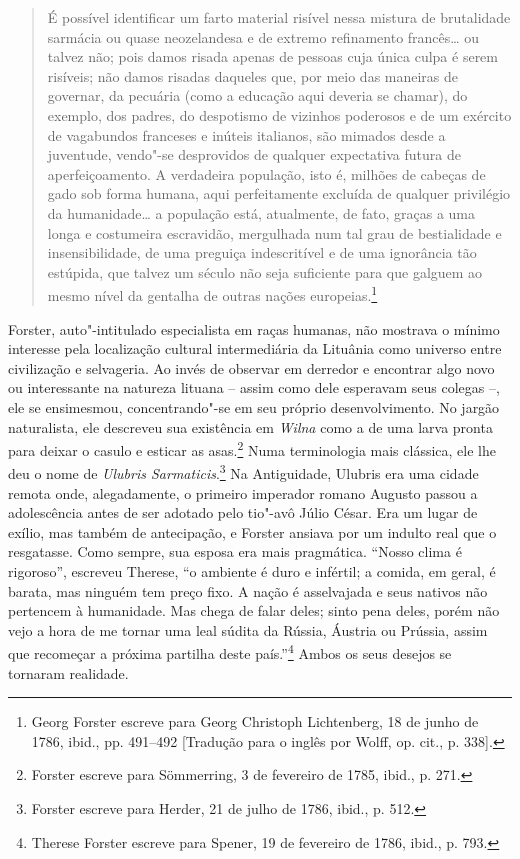 \begin{quote}
É possível identificar um farto material risível nessa mistura de
brutalidade sarmácia ou quase neozelandesa e de extremo refinamento
francês\ldots{} ou talvez não; pois damos risada apenas de pessoas cuja
única culpa é serem risíveis; não damos risadas daqueles que, por meio
das maneiras de governar, da pecuária (como a educação aqui deveria se
chamar), do exemplo, dos padres, do despotismo de vizinhos poderosos e
de um exército de vagabundos franceses e inúteis italianos, são mimados
desde a juventude, vendo"-se desprovidos de qualquer expectativa futura
de aperfeiçoamento. A verdadeira população, isto é, milhões de cabeças
de gado sob forma humana, aqui perfeitamente excluída de qualquer
privilégio da humanidade\ldots{} a população está, atualmente, de fato,
graças a uma longa e costumeira escravidão, mergulhada num tal grau de
bestialidade e insensibilidade, de uma preguiça indescritível e de uma
ignorância tão estúpida, que talvez um século não seja suficiente para
que galguem ao mesmo nível da gentalha de outras nações
europeias.\footnote{Georg Forster escreve para Georg Christoph Lichtenberg, 18 de junho de 1786, ibid., pp. 491--492 [Tradução para o inglês por Wolff, op. cit., p. 338].}
\end{quote}

Forster, auto"-intitulado especialista em raças humanas, não mostrava o
mínimo interesse pela localização cultural intermediária da Lituânia
como universo entre civilização e selvageria. Ao invés de observar em
derredor e encontrar algo novo ou interessante na natureza lituana -- assim como dele esperavam seus colegas --, 
ele se ensimesmou,
concentrando"-se em seu próprio desenvolvimento. No jargão naturalista,
ele descreveu sua existência em \textit{Wilna} como a de uma larva pronta para
deixar o casulo e esticar as asas.\footnote{Forster escreve para Sömmerring, 3 de fevereiro de 1785, ibid., p. 271.} Numa terminologia mais clássica, ele lhe deu o nome de \textit{Ulubris
Sarmaticis}.\footnote{Forster escreve para Herder, 21 de julho de 1786, ibid., p. 512.} Na Antiguidade, Ulubris era uma cidade remota onde, alegadamente, o primeiro imperador romano Augusto passou
a adolescência antes de ser adotado pelo tio"-avô Júlio César. Era um
lugar de exílio, mas também de antecipação, e Forster ansiava por um
indulto real que o resgatasse. Como sempre, sua esposa era mais
pragmática. ``Nosso clima é rigoroso'', escreveu Therese, ``o ambiente é
duro e infértil; a comida, em geral, é barata, mas ninguém tem preço
fixo. A nação é asselvajada e seus nativos não pertencem à humanidade.
Mas chega de falar deles; sinto pena deles, porém não vejo a hora de me
tornar uma leal súdita da Rússia, Áustria ou Prússia, assim que
recomeçar a próxima partilha deste país.''\footnote{Therese Forster escreve para Spener, 19 de fevereiro de 1786, ibid., p. 793.} Ambos os seus desejos se tornaram realidade.

